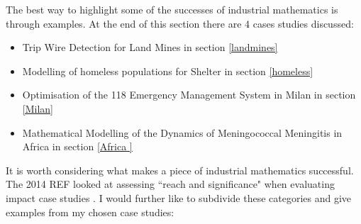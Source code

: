 \documentclass[11pt]{article} %
\begin{document}
	The best way to highlight some of the successes of industrial mathematics is through examples. At the end of this section there are 4 cases studies discussed: 
	\begin{itemize}
		\item Trip Wire Detection for Land Mines in section \ref{landmines}
		\item Modelling of homeless populations for Shelter in section \ref{homeless}
		\item Optimisation of the 118 Emergency Management System in Milan in section \ref{Milan}
		\item Mathematical Modelling of the Dynamics of Meningococcal Meningitis in Africa in section \ref{Africa }
	\end{itemize}

It is worth considering what makes a piece of industrial mathematics successful. The 2014 REF looked at assessing ``reach and significance" when evaluating impact case studies \cite{impactcriteria2014}. I would further like to subdivide these categories and give examples from my chosen case studies:
\end{document}
